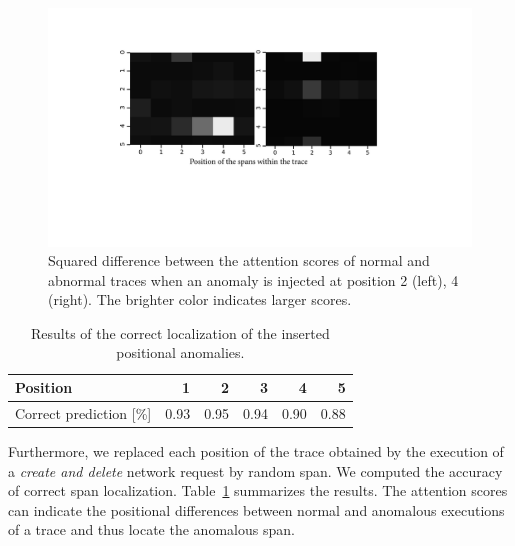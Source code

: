 \begin{figure}[!t]
\centering
\includegraphics[width=1.0\columnwidth]{gfx/chap6/tracefingerprint.pdf}
\caption{Squared difference between the attention scores of normal and abnormal traces when an anomaly is injected at position 2 (left), 4 (right). The brighter color indicates larger scores.}
\label{fig:5}
\end{figure}



\begin{table}[!t]
\centering
   \caption{Results of the correct localization of the inserted positional anomalies.}
   \label{tab:2}
   \begin{tabular}{lrrrrr}
     \toprule
     Position & 1 & 2 & 3 & 4 & 5 \\
     \midrule
     Correct prediction [\%] & 0.93 & 0.95 & 0.94 & 0.90 & 0.88    \\
     \bottomrule
   \end{tabular}
\end{table}


Furthermore, we replaced each position of the trace obtained by the execution of a \textit{create and delete} network request by random span. We computed the accuracy of correct span localization. Table~\ref{tab:2} summarizes the results. The attention scores can indicate the positional differences between normal and anomalous executions of a trace and thus locate the anomalous span.

